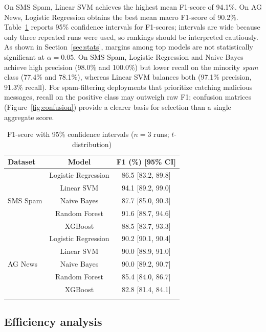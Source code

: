 \documentclass[pdflatex,sn-mathphys-num]{sn-jnl}
\begin{document}
On SMS Spam, Linear SVM achieves the highest mean F1-score of 94.1\%. On AG News, Logistic Regression obtains the best mean macro F1-score of 90.2\%. Table~\ref{tab:f1_ci} reports 95\% confidence intervals for F1-scores; intervals are wide because only three repeated runs were used, so rankings should be interpreted cautiously. As shown in Section~\ref{sec:stats}, margins among top models are not statistically significant at $\alpha=0.05$. On SMS Spam, Logistic Regression and Naive Bayes achieve high precision (98.0\% and 100.0\%) but lower recall on the minority \textit{spam} class (77.4\% and 78.1\%), whereas Linear SVM balances both (97.1\% precision, 91.3\% recall). For spam-filtering deployments that prioritize catching malicious messages, recall on the positive class may outweigh raw F1; confusion matrices (Figure~\ref{fig:confusion}) provide a clearer basis for selection than a single aggregate score.

\begin{table}[t]
\caption{F1-score with 95\% confidence intervals ($n=3$ runs; $t$-distribution)}\label{tab:f1_ci}
\begin{tabular*}{\textwidth}{@{\extracolsep\fill}lcc}
\toprule
Dataset & Model & F1 (\%) [95\% CI] \\
\midrule
\multirow{5}{*}{SMS Spam}
 & Logistic Regression & 86.5 [83.2, 89.8] \\
 & Linear SVM          & 94.1 [89.2, 99.0] \\
 & Naive Bayes         & 87.7 [85.0, 90.3] \\
 & Random Forest       & 91.6 [88.7, 94.6] \\
 & XGBoost             & 88.5 [83.7, 93.3] \\
\midrule
\multirow{5}{*}{AG News}
 & Logistic Regression & 90.2 [90.1, 90.4] \\
 & Linear SVM          & 90.0 [88.9, 91.0] \\
 & Naive Bayes         & 90.0 [89.2, 90.7] \\
 & Random Forest       & 85.4 [84.0, 86.7] \\
 & XGBoost             & 82.8 [81.4, 84.1] \\
\botrule
\end{tabular*}
\end{table}

\subsection{Efficiency analysis}
\end{document}

